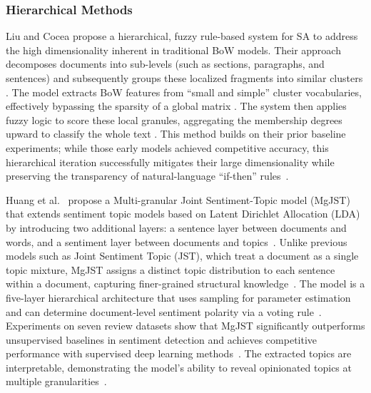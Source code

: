\documentclass[a4paper,twoside,12pt]{book}
\begin{document}
\subsubsection{Hierarchical Methods}

Liu and Cocea \cite{Liu2017fuzzy} propose a hierarchical, fuzzy rule-based system for SA to address the high dimensionality inherent in traditional BoW models. Their approach decomposes documents into sub-levels (such as sections, paragraphs, and sentences) and subsequently groups these localized fragments into similar clusters \cite{Liu2017fuzzy}. The model extracts BoW features from ``small and simple'' cluster vocabularies, effectively bypassing the sparsity of a global matrix \cite{Liu2017fuzzy}. The system then applies fuzzy logic to score these local granules, aggregating the membership degrees upward to classify the whole text \cite{Liu2017fuzzy}. This method builds on their prior baseline experiments; while those early models achieved competitive accuracy, this hierarchical iteration successfully mitigates their large dimensionality while preserving the transparency of natural-language ``if-then'' rules~\cite{Liu2017fuzzy}.

Huang et al.~\cite{Huang2022multigranular} propose a Multi-granular Joint Sentiment-Topic model (MgJST) that extends sentiment topic models based on Latent Dirichlet Allocation (LDA) by introducing two additional layers: a sentence layer between documents and words, and a sentiment layer between documents and topics~\cite{Huang2022multigranular}. Unlike previous models such as Joint Sentiment Topic (JST), which treat a document as a single topic mixture, MgJST assigns a distinct topic distribution to each sentence within a document, capturing finer-grained structural knowledge~\cite{Huang2022multigranular}. The model is a five-layer hierarchical architecture that uses sampling for parameter estimation and can determine document-level sentiment polarity via a voting rule~\cite{Huang2022multigranular}. Experiments on seven review datasets show that MgJST significantly outperforms unsupervised baselines in sentiment detection and achieves competitive performance with supervised deep learning methods~\cite{Huang2022multigranular}. The extracted topics are interpretable, demonstrating the model's ability to reveal opinionated topics at multiple granularities~\cite{Huang2022multigranular}.
\end{document}
